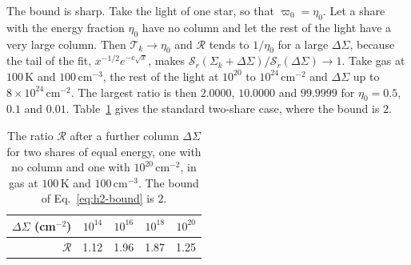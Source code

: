 The bound is sharp. Take the light of one star, so that $\varpi_0=\eta_0$.
Let a share with the energy fraction $\eta_0$ have no column and let the rest of the light have a very large column. Then
$\mathcal T_k\to\eta_0$ and $\mathcal R$ tends to $1/\eta_0$ for a large
$\Delta\Sigma$, because the tail of the fit,
$x^{-1/2}e^{-c\sqrt x}$, makes
$\mathcal S_r(\Sigma_k+\Delta\Sigma)/\mathcal S_r(\Delta\Sigma)\to1$. Take gas at
$100$\,K and $100$\,cm$^{-3}$, the rest of the light at $10^{20}$ to
$10^{24}$\,cm$^{-2}$ and $\Delta\Sigma$ up to $8\times10^{24}$\,cm$^{-2}$. The
largest ratio is then $2.0000$, $10.0000$ and $99.9999$ for $\eta_0=0.5$, $0.1$
and $0.01$.
Table~\ref{tab:h2-two-share} gives the standard two-share case, where the
bound is $2$.

\begin{table}[htbp]
\centering
\caption{The ratio $\mathcal R$ after a further column $\Delta\Sigma$ for two
shares of equal energy, one with no column and one with
$10^{20}$\,cm$^{-2}$, in gas at $100$\,K and $100$\,cm$^{-3}$. The bound of
Eq.~\eqref{eq:h2-bound} is $2$.}
\label{tab:h2-two-share}
\begin{tabular}{rrrrr}
\toprule
$\Delta\Sigma$ (cm$^{-2}$) & $10^{14}$ & $10^{16}$ & $10^{18}$ & $10^{20}$ \\
\midrule
$\mathcal R$ & 1.12 & 1.96 & 1.87 & 1.25 \\
\bottomrule
\end{tabular}
\end{table}

